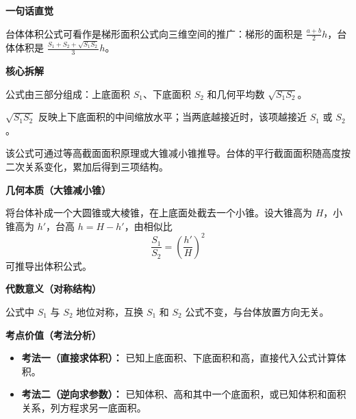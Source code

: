 \begin{explanationbox}

	\textbf{\textcolor{CExplanation}{一句话直觉}}

	台体体积公式可看作是梯形面积公式向三维空间的推广：梯形的面积是 $\frac{a+b}{2}h$，台体体积是 $\frac{S_1+S_2+\sqrt{S_1S_2}}{3}h$。

	\medskip

	\textbf{\textcolor{CExplanation}{核心拆解}}

	\begin{description}[style=nextline, leftmargin=2.8em, labelsep=0.5em, itemsep=0.45em]
		\item[\textbf{要点一（三部分求和）：}]
		      公式由三部分组成：上底面积 $S_1$、下底面积 $S_2$ 和几何平均数 $\sqrt{S_1S_2}$。

		\item[\textbf{要点二（几何平均意义）：}]
		      $\sqrt{S_1S_2}$ 反映上下底面积的中间缩放水平；当两底越接近时，该项越接近 $S_1$ 或 $S_2$。

		\item[\textbf{要点三（截面面积原理）：}]
		      该公式可通过等高截面面积原理或大锥减小锥推导。台体的平行截面面积随高度按二次关系变化，累加后得到三项结构。
	\end{description}

	\medskip

	\textbf{\textcolor{CExplanation}{几何本质（大锥减小锥）}}

	将台体补成一个大圆锥或大棱锥，在上底面处截去一个小锥。设大锥高为 $H$，小锥高为 $h'$，台高 $h = H - h'$，由相似比
	\[
		\frac{S_1}{S_2} = \left(\frac{h'}{H}\right)^2
	\]
	可推导出体积公式。

	\medskip

	\textbf{\textcolor{CExplanation}{代数意义（对称结构）}}

	公式中 $S_1$ 与 $S_2$ 地位对称，互换 $S_1$ 和 $S_2$ 公式不变，与台体放置方向无关。

	\medskip

	\textbf{\textcolor{CExplanation}{考点价值（考法分析）}}

	\begin{itemize}[leftmargin=*, itemsep=0.5em, topsep=0.4em]
		\item \textbf{考法一（直接求体积）：} 已知上底面积、下底面积和高，直接代入公式计算体积。
		\item \textbf{考法二（逆向求参数）：} 已知体积、高和其中一个底面积，或已知体积和面积关系，列方程求另一底面积。
	\end{itemize}


\end{explanationbox}
